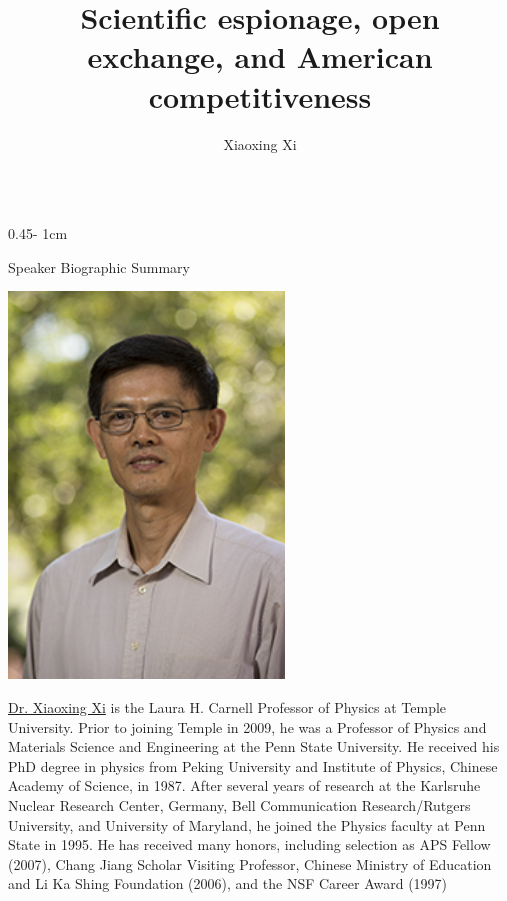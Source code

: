 \documentclass{../psuposter}
\title{Scientific espionage, open exchange, and American competitiveness}
\author{Xiaoxing Xi}
\institute{Temple University}
\begin{document}
\begin{frame}
\begin{columns}[t, totalwidth=\textwidth]
\begin{column}{0.45\textwidth - 1cm}


    \begin{block}{Speaker Biographic Summary}
    	\begin{center}
    		\includegraphics[width=0.55\textwidth]{images/portrait}
    	\end{center}
    	\href{https://phys.cst.temple.edu/xiaoxing-xi.html}{Dr. Xiaoxing Xi} is the Laura H. Carnell Professor of Physics at Temple University. Prior to joining Temple in 2009, he was a Professor of Physics and Materials Science and Engineering at the Penn State University. He received his PhD degree in physics from Peking University and Institute of Physics, Chinese Academy of Science, in 1987. After several years of research at the Karlsruhe Nuclear Research Center, Germany, Bell Communication Research/Rutgers University, and University of Maryland, he joined the Physics faculty at Penn State in 1995. He has received many honors, including selection as APS Fellow (2007), Chang Jiang Scholar Visiting Professor, Chinese Ministry of Education and Li Ka Shing Foundation (2006), and the NSF Career Award (1997)
    \end{block}



\end{column}
\end{columns}
\end{frame}
\end{document}
